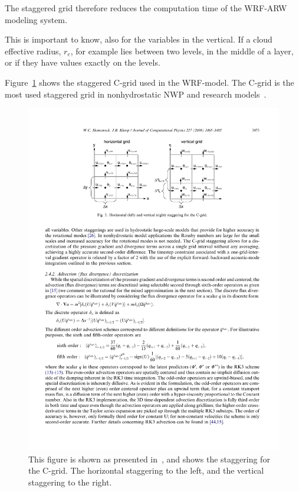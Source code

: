 The staggered grid therefore reduces the computation time of the WRF-ARW modeling system.

This is important to know, also for the variables in the vertical. If a cloud effective radius, $r_e$, for example lies between two levels, in the middle of a layer, or if they have values exactly on the levels.

Figure~\ref{fig:stagger} shows the staggered C-grid used in the WRF-model. The C-grid is the most used staggered grid in nonhydrostatic NWP and research models~\citep{Skamarock2008}.

\begin{figure}%
\centering
\includegraphics[width=\textwidth]{model_methods/gridstagger.pdf}
\caption{This figure is shown as presented in~\citet{Skamarock2008}, and shows the staggering for the C-grid. The horizontal staggering to the left, and the vertical staggering to the right.}
\label{fig:stagger}
\end{figure}

